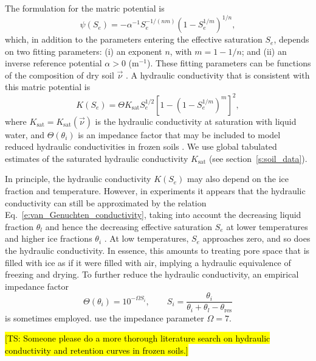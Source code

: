 \documentclass{report}
\begin{document}
The \citet{vanGenuchten80a} formulation for the matric potential is
\begin{equation}\label{e:van_Genuchten_potential}
    \psi(S_e) = - \alpha^{-1} S_e^{-1/(nm)} \left( 1 - S_e^{1/m} \right)^{1/n},
\end{equation}
which, in addition to the parameters entering the effective saturation $S_e$, depends on two fitting parameters: (i) an exponent $n$, with $m=1-1/n$; and (ii) an inverse reference potential $\alpha>0$ ($\mathrm{m^{-1}}$). These fitting parameters can be functions of the composition of dry soil $\vec{\nu}$ \citep{Bonan19a}. A hydraulic conductivity that is consistent with this matric potential is 
\begin{equation}\label{e:van_Genuchten_conductivity}
     K(S_e) = \Theta K_{\mathrm{sat}} S_e^{1/2} \left [1 -  (1 - S_e^{1/m})^m  \right]^2,
\end{equation}
where $K_{\mathrm{sat}} = K_{\mathrm{sat}}(\vec{\nu})$ is the hydraulic conductivity at saturation with liquid water, and $\Theta(\theta_i)$ is an impedance factor that may be included to model reduced hydraulic conductivities in frozen soils \citep{Lundin90a}. We use global tabulated estimates of the saturated hydraulic conductivity $K_{\mathrm{sat}}$ \citep{Dai19a} (see section~\ref{s:soil_data}). 

In principle, the hydraulic conductivity $K(S_e)$ may also depend on the ice fraction and temperature. However, in experiments it appears that the hydraulic conductivity can still be approximated by the relation Eq.~\eqref{e:van_Genuchten_conductivity}, taking into account the decreasing liquid fraction $\theta_l$ and hence the decreasing effective saturation $S_e$ at lower temperatures and higher ice fractions $\theta_i$ \citep{Watanabe08a}. At low temperatures, $S_e$ approaches zero, and so does the hydraulic conductivity. In essence, this amounts to treating pore space that is filled with ice as if it were filled with air, implying a hydraulic equivalence of freezing and drying. To further reduce the hydraulic conductivity, an empirical impedance factor \citep{Lundin90a,Hansson04a,Swenson12a}
\begin{equation}
    \Theta(\theta_i) = 10^{-\Omega S_i}, \qquad S_i = \frac{\theta_i}{\theta_i + \theta_l - \theta_{\mathrm{res}}}
\end{equation}
is sometimes employed. \citet{Hansson04a} use the impedance parameter $\Omega = 7$.

\hl{[TS: Someone please do a more thorough literature search on hydraulic conductivity and retention curves in frozen soils.]}
\end{document}
